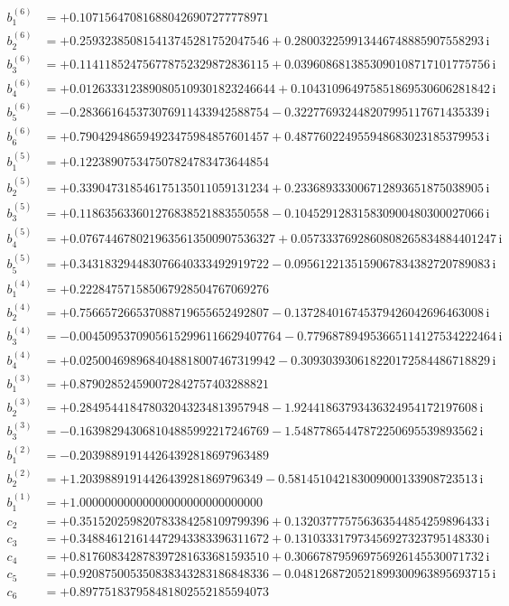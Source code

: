 {\begin{align*}
b^{(6)}_{1} &= +0.107156470816880426907277778971\\
b^{(6)}_{2} &= +0.259323850815413745281752047546 + 0.280032259913446748885907558293\,\mathrm{i}\\
b^{(6)}_{3} &= +0.114118524756778752329872836115 + 0.0396086813853090108717101775756\,\mathrm{i}\\
b^{(6)}_{4} &= +0.0126333123890805109301823246644 + 0.104310964975851869530606281842\,\mathrm{i}\\
b^{(6)}_{5} &= -0.283661645373076911433942588754 - 0.322776932448207995117671435339\,\mathrm{i}\\
b^{(6)}_{6} &= +0.790429486594923475984857601457 + 0.487760224955948683023185379953\,\mathrm{i}\\[1mm]
b^{(5)}_{1} &= +0.122389075347507824783473644854\\
b^{(5)}_{2} &= +0.339047318546175135011059131234 + 0.233689333006712893651875038905\,\mathrm{i}\\
b^{(5)}_{3} &= +0.118635633601276838521883550558 - 0.104529128315830900480300027066\,\mathrm{i}\\
b^{(5)}_{4} &= +0.0767446780219635613500907536327 + 0.0573337692860808265834884401247\,\mathrm{i}\\
b^{(5)}_{5} &= +0.343183294483076640333492919722 - 0.0956122135159067834382720789083\,\mathrm{i}\\[1mm]
b^{(4)}_{1} &= +0.222847571585067928504767069276\\
b^{(4)}_{2} &= +0.756657266537088719655652492807 - 0.137284016745379426042696463008\,\mathrm{i}\\
b^{(4)}_{3} &= -0.00450953709056152996116629407764 - 0.779687894953665114127534222464\,\mathrm{i}\\
b^{(4)}_{4} &= +0.0250046989684048818007467319942 - 0.309303930618220172584486718829\,\mathrm{i}\\[1mm]
b^{(3)}_{1} &= +0.879028524590072842757403288821\\
b^{(3)}_{2} &= +0.284954418478032043234813957948 - 1.92441863793436324954172197608\,\mathrm{i}\\
b^{(3)}_{3} &= -0.163982943068104885992217246769 - 1.54877865447872250695539893562\,\mathrm{i}\\[1mm]
b^{(2)}_{1} &= -0.203988919144264392818697963489\\
b^{(2)}_{2} &= +1.20398891914426439281869796349 - 0.581451042183009000133908723513\,\mathrm{i}\\[1mm]
b^{(1)}_{1} &= +1.00000000000000000000000000000\\[1mm]
c_{2} &= +0.351520259820783384258109799396 + 0.132037775756363544854259896433\,\mathrm{i}\\
c_{3} &= +0.348846121614472943383396311672 + 0.131033317973456927323795148330\,\mathrm{i}\\
c_{4} &= +0.817608342878397281633681593510 + 0.306678795969756926145530071732\,\mathrm{i}\\
c_{5} &= +0.920875005350838343283186848336 - 0.0481268720521899300963895693715\,\mathrm{i}\\
c_{6} &= +0.897751837958481802552185594073
\end{align*}
}

